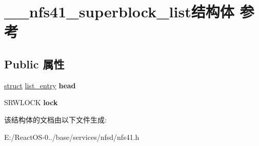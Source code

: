 \hypertarget{struct____nfs41__superblock__list}{}\section{\+\_\+\+\_\+nfs41\+\_\+superblock\+\_\+list结构体 参考}
\label{struct____nfs41__superblock__list}
\subsection*{Public 属性}
\begin{DoxyCompactItemize}
\item 
\mbox{\label{struct____nfs41__superblock__list_a917590b24c905a9a5adb433fd8c861c3}} 
\hyperlink{interfacestruct}{struct} \hyperlink{structlist__entry}{list\+\_\+entry} {\bfseries head}
\item 
\mbox{\label{struct____nfs41__superblock__list_af7a50fe49a65e5ffc0fb5b6090eee43f}} 
S\+R\+W\+L\+O\+CK {\bfseries lock}
\end{DoxyCompactItemize}


该结构体的文档由以下文件生成\+:\begin{DoxyCompactItemize}
\item 
E\+:/\+React\+O\+S-\/0../base/services/nfsd/nfs41.\+h\end{DoxyCompactItemize}
